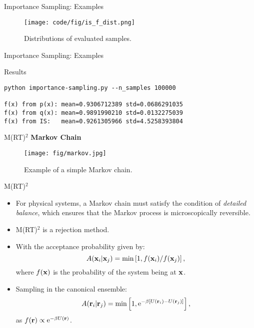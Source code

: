 \documentclass[10pt]{beamer}
\begin{document}
\begin{frame}{Importance Sampling: Examples}
\begin{figure}
  \texttt{[image: code/fig/is\_f\_dist.png]}
  \caption{Distributions of evaluated samples.}
\end{figure}
\end{frame}

\begin{frame}[fragile]{Importance Sampling: Examples}
\begin{block}{Results}
\begin{lstlisting}
python importance-sampling.py --n_samples 100000

f(x) from p(x): mean=0.9306712389 std=0.0686291035
f(x) from q(x): mean=0.9891990210 std=0.0132275039
f(x) from IS:   mean=0.9261305966 std=4.5258393804
\end{lstlisting}
\end{block}
\end{frame}

\begin{frame}{M(RT)$^2$}
\textbf{Markov Chain}\vspace{0.2cm}
\begin{figure}
  \texttt{[image: fig/markov.jpg]}
  \caption{Example of a simple Markov chain.}
\end{figure}
\end{frame}

\begin{frame}{M(RT)$^2$}
\begin{itemize}
\setlength\itemsep{1em}
  \item For physical systems, a Markov chain must satisfy the condition of \textit{detailed balance}, which ensures that the Markov process is microscopically reversible.

  \item M(RT)$^2$ is a rejection method.

  \item With the acceptance probability given by:
  \begin{equation}
    A({\bf x}_i | {\bf x}_j) = \min\left[1, {f({\bf x}_i)}/{f({\bf x}_j)}\right],
  \end{equation}
  where $f({\bf x})$ is the probability of the system being at ${\bf x}$.

  \item Sampling in the canonical ensemble:
  \begin{equation}
    A({\bf r}_i | {\bf r}_j) = \min\left[1, \mathrm{e}^{-\beta \left[U({\bf r}_i)-U({\bf r}_j)\right]} \right],
  \end{equation}
  as $f({\bf r}) \propto \mathrm{e}^{-\beta U({\bf r})}$.
\end{itemize}
\end{frame}
\end{document}
